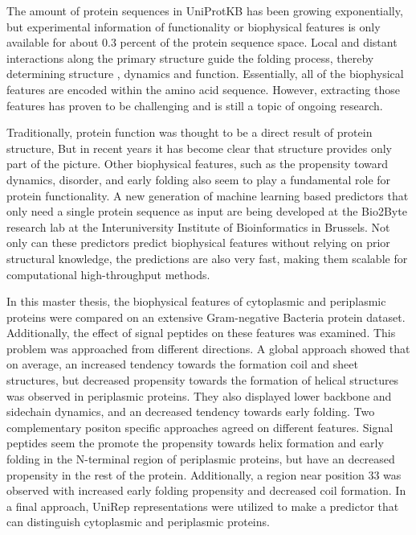 The amount of protein sequences in UniProtKB has been growing exponentially,
but experimental information of functionality or biophysical features is only available for about 0.3 percent of the protein sequence space.
Local and distant interactions along the primary structure guide the folding process,
thereby determining structure , dynamics and function.
Essentially, all of the biophysical features are encoded within the amino acid sequence.
However, extracting those features has proven to be challenging and is still a topic of ongoing research.

Traditionally, protein function was thought to be a direct result of protein structure,
But in recent years it has become clear that structure provides only part of the picture.
Other biophysical features, such as the propensity toward dynamics, disorder, and early folding also seem to play a fundamental role for protein functionality.
A new generation of machine learning based predictors that only need a single protein sequence as input
are being developed at the Bio2Byte research lab at the Interuniversity Institute of Bioinformatics in Brussels.
Not only can these predictors predict biophysical features without relying on prior structural knowledge,
the predictions are also very fast,
making them scalable for computational high-throughput methods.

In this master thesis,
the biophysical features of cytoplasmic and periplasmic proteins were compared on an extensive Gram-negative Bacteria protein dataset.
Additionally, the effect of signal peptides on these features was examined.
This problem was approached from different directions.
A global approach showed that on average,
an increased tendency towards the formation coil and sheet structures,
but decreased propensity towards the formation of helical structures was observed in periplasmic proteins.
They also displayed lower backbone and sidechain dynamics,
and an decreased tendency towards early folding.
Two complementary positon specific approaches agreed on different features.
Signal peptides seem the promote the propensity towards helix formation and early folding in the N-terminal region of periplasmic proteins, 
but have an decreased propensity in the rest of the protein.
Additionally, a region near position 33 was observed with increased early folding propensity and decreased coil formation.
In a final approach, UniRep representations were utilized to make a predictor that can distinguish cytoplasmic and periplasmic proteins.

